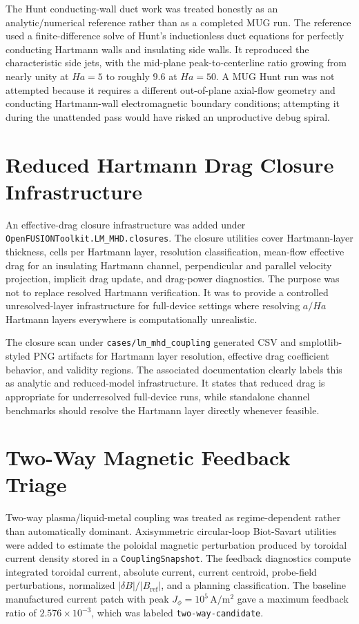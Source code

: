 \documentclass[11pt]{article}
\begin{document}
The Hunt conducting-wall duct work was treated honestly as an analytic/numerical reference rather than as a completed MUG run. The reference used a finite-difference solve of Hunt's inductionless duct equations for perfectly conducting Hartmann walls and insulating side walls. It reproduced the characteristic side jets, with the mid-plane peak-to-centerline ratio growing from nearly unity at \(Ha=5\) to roughly \(9.6\) at \(Ha=50\). A MUG Hunt run was not attempted because it requires a different out-of-plane axial-flow geometry and conducting Hartmann-wall electromagnetic boundary conditions; attempting it during the unattended pass would have risked an unproductive debug spiral.

\section{Reduced Hartmann Drag Closure Infrastructure}

An effective-drag closure infrastructure was added under \texttt{OpenFUSIONToolkit.LM\_MHD.closures}. The closure utilities cover Hartmann-layer thickness, cells per Hartmann layer, resolution classification, mean-flow effective drag for an insulating Hartmann channel, perpendicular and parallel velocity projection, implicit drag update, and drag-power diagnostics. The purpose was not to replace resolved Hartmann verification. It was to provide a controlled unresolved-layer infrastructure for full-device settings where resolving \(a/Ha\) Hartmann layers everywhere is computationally unrealistic.

The closure scan under \texttt{cases/lm\_mhd\_coupling} generated CSV and smplotlib-styled PNG artifacts for Hartmann layer resolution, effective drag coefficient behavior, and validity regions. The associated documentation clearly labels this as analytic and reduced-model infrastructure. It states that reduced drag is appropriate for underresolved full-device runs, while standalone channel benchmarks should resolve the Hartmann layer directly whenever feasible.

\section{Two-Way Magnetic Feedback Triage}

Two-way plasma/liquid-metal coupling was treated as regime-dependent rather than automatically dominant. Axisymmetric circular-loop Biot-Savart utilities were added to estimate the poloidal magnetic perturbation produced by toroidal current density stored in a \texttt{CouplingSnapshot}. The feedback diagnostics compute integrated toroidal current, absolute current, current centroid, probe-field perturbations, normalized \(|\delta B|/|B_{\mathrm{ref}}|\), and a planning classification. The baseline manufactured current patch with peak \(J_\phi = 10^5\,\mathrm{A/m^2}\) gave a maximum feedback ratio of \(2.576\times 10^{-3}\), which was labeled \texttt{two-way-candidate}.
\end{document}

